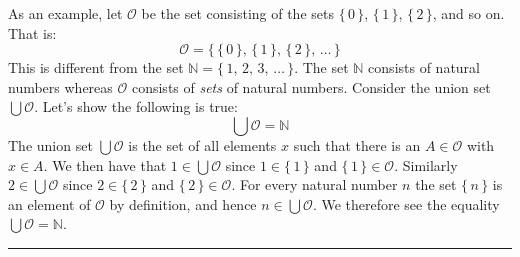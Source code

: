             \begin{example}
                As an example, let $\mathcal{O}$ be the set consisting of
                the sets $\{\,0\,\}$, $\{\,1\,\}$, $\{\,2\,\}$, and so on.
                That is:
                \begin{equation}
                    \mathcal{O}=
                    \big\{\,\{\,0\,\},\,\{\,1\,\},\,\{\,2\,\},\,\dots\,\big\}
                \end{equation}
                This is different from the set
                $\mathbb{N}=\{\,1,\,2,\,3,\,\dots\,\}$. The set $\mathbb{N}$
                consists of natural numbers whereas $\mathcal{O}$ consists of
                \textit{sets} of natural numbers. Consider the union set
                $\bigcup\mathcal{O}$. Let's show the following is true:
                \begin{equation}
                    \bigcup\mathcal{O}=\mathbb{N}
                \end{equation}
                The union set $\bigcup\mathcal{O}$ is the set of all elements
                $x$ such that there is an $A\in\mathcal{O}$ with $x\in{A}$.
                We then have that $1\in\bigcup\mathcal{O}$ since
                $1\in\{\,1\,\}$ and $\{\,1\,\}\in\mathcal{O}$. Similarly
                $2\in\bigcup\mathcal{O}$ since $2\in\{\,2\,\}$ and
                $\{\,2\,\}\in\mathcal{O}$. For every natural number
                $n$ the set $\{\,n\,\}$ is an element of $\mathcal{O}$ by
                definition, and hence $n\in\bigcup\mathcal{O}$. We therefore
                see the equality $\bigcup\mathcal{O}=\mathbb{N}$.
            \end{example}
            \hrule
